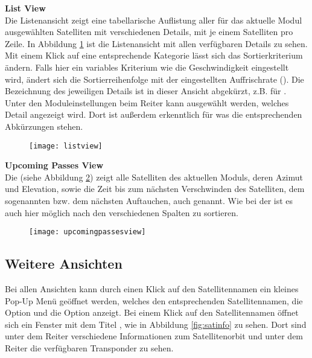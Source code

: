 \clearpage

\textbf{List View}\\
Die Listenansicht zeigt eine tabellarische Auflistung aller für das aktuelle Modul ausgewählten Satelliten mit verschiedenen Details, mit je einem Satelliten pro Zeile. In Abbildung \ref{fig:listview} ist die Listenansicht mit allen verfügbaren Details zu sehen. Mit einem Klick auf eine entsprechende Kategorie lässt sich das Sortierkriterium ändern. Falls hier ein variables Kriterium wie die Geschwindigkeit eingestellt wird, ändert sich die Sortierreihenfolge mit der eingestellten Auffrischrate (). Die Bezeichnung des jeweiligen Details ist in dieser Ansicht abgekürzt, z.B.  für . Unter den Moduleinstellungen beim Reiter  kann ausgewählt werden, welches Detail angezeigt wird. Dort ist außerdem erkenntlich für was die entsprechenden Abkürzungen stehen.

\begin{figure}[h]
	\centering
	\texttt{[image: listview]}
	\caption{}
	\label{fig:listview} 
\end{figure}

\textbf{Upcoming Passes View}\\
Die  (siehe Abbildung \ref{fig:upcomingpassesview}) zeigt alle Satelliten des aktuellen Moduls, deren Azimut und Elevation, sowie die Zeit bis zum nächsten Verschwinden des Satelliten, dem sogenannten  bzw. dem nächsten Auftauchen, auch  genannt. Wie bei der  ist es auch hier möglich nach den verschiedenen Spalten zu sortieren.

\begin{figure}[h]
	\centering
	\texttt{[image: upcomingpassesview]}
	\caption{}
	\label{fig:upcomingpassesview} 
\end{figure}

\clearpage

\subsection{Weitere Ansichten}

Bei allen Ansichten kann durch einen Klick auf den Satellitennamen ein kleines Pop-Up Menü geöffnet werden, welches den entsprechenden Satellitennamen, die Option  und die Option  anzeigt. Bei einem Klick auf den Satellitennamen öffnet sich ein Fenster mit dem Titel , wie in Abbildung \ref{fig:satinfo} zu sehen. Dort sind unter dem Reiter  verschiedene Informationen zum Satellitenorbit und unter dem Reiter  die verfügbaren Transponder zu sehen.


